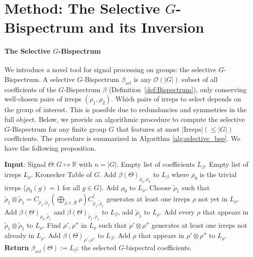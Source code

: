 \documentclass{article}
\theoremstyle{plain}
\theoremstyle{definition}
\theoremstyle{remark}
\begin{document}
\section{Method: The Selective $G$-Bispectrum and its Inversion}\label{sec:bspinversion}

\paragraph{The Selective $G$-Bispectrum} We introduce a novel tool for signal processing on groups: the selective $G$-Bispectrum. %
A selective $G$-Bispectrum $\beta_{sel}$ is any $\mathcal{O}(|G|)$  subset of all coefficients of the $G$-Bispectrum $\beta$ (Definition~\ref{def:Bispectrum}), only conserving well-chosen pairs of irreps $(\rho_1, \rho_2)$. Which pairs of irreps to select depends on the group of interest.  This is possible due to redundancies and symmetries in the full object. Below, we provide an algorithmic procedure to compute the selective $G$-Bispectrum for any finite group $G$ that features at most $|\text{Irreps}|(\leq |G|)$ coefficients. The procedure is summarized in Algorithm \ref{alg:selective_bsp}. We have the following proposition.

\begin{algorithm}
    \caption{Selective $G$-Bispectrum on any finite group $G$}\label{alg:selective_bsp}
    \small
    \begin{algorithmic}[1]
        \STATE \textbf{Input}: Signal $\Theta: G \mapsto \mathbb{R}$ with $n = |G|$. Empty list of coefficients $L_\beta$. Empty list of irreps $L_\rho$. Kronecker Table of $G$.
        \STATE Add $\beta(\Theta)_{\rho_0,\rho_0}$ to $L_\beta$ where $\rho_0$ is the trivial irreps ($\rho_0(g)=1$ for all $g\in G$).
        \STATE Add $\rho_0$ to $L_\rho$.
        \STATE Choose $\tilde \rho_1$ such that $\tilde \rho_1 \otimes\tilde  \rho_1 = C_{\tilde \rho_1,\tilde \rho_1}\left(\bigoplus_{\rho \in \mathcal{R}} \rho\right) C_{\tilde \rho_1,\tilde \rho_1}^\dagger$ generates at least one irreps $\rho$ not yet in $L_\rho$.
        \STATE Add $\beta(\Theta)_{\rho_0,\tilde \rho_1}$ and $\beta(\Theta)_{\tilde \rho_1,\tilde \rho_1}$ to $L_\beta$, add $\tilde \rho_1$ to $L_\rho$.
        \STATE Add every $\rho$ that appears in $\tilde \rho_1 \otimes\tilde  \rho_1$ to $L_\rho$.
            \STATE Find $\rho', \rho''$ in $L_\rho$ such that $\rho' \otimes \rho'' $ generates at least one irreps not already in $L_\rho$.
            \STATE Add $\beta(\Theta)_{\rho',\rho''}$ to $L_\beta$.
            \STATE Add $\rho$ that appears in $\rho' \otimes \rho''$ to $L_\rho$.
        \ENDWHILE
        \STATE \textbf{Return} $\beta_{sel}(\Theta):=L_\beta$: the selected $G$-bispectral coefficients.
    \end{algorithmic}
\end{algorithm}
\end{document}
